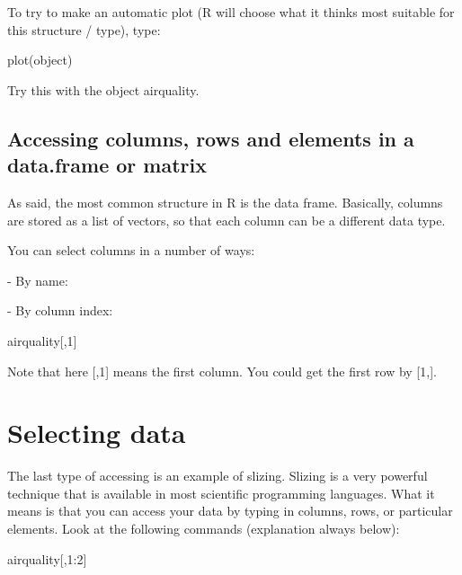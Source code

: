 \documentclass[a4paper,twoside]{tufte-book}\usepackage[]{graphicx}\usepackage[]{color}
\begin{document}
\begin{appendices}
To try to make an automatic plot (R will choose what it thinks most suitable for this structure / type), type:

\begin{Schunk}
\begin{Sinput}
plot(object)
\end{Sinput}
\end{Schunk}

Try this with the object airquality. 

\subsection{Accessing columns, rows and elements in a data.frame or matrix}

As said, the most common structure in R is the data frame. Basically, columns are stored as a list of vectors, so that each column can be a different data type.

You can select columns in a number of ways:

- By name:
\begin{Schunk}
\end{Schunk}

- By column index: 

\begin{Schunk}
\begin{Sinput}
airquality[,1]
\end{Sinput}
\end{Schunk}

Note that here [,1] means the first column. You could get the first row by [1,].

\section{Selecting data}

The last type of accessing is an example of slizing. Slizing is a very powerful technique that is available in most scientific programming languages. What it means is that you can access your data by typing in columns, rows, or particular elements. Look at the following commands (explanation always below):

\begin{Schunk}
\begin{Sinput}
airquality[,1:2]
\end{Sinput}
\end{Schunk}


\end{appendices}
\end{document}

